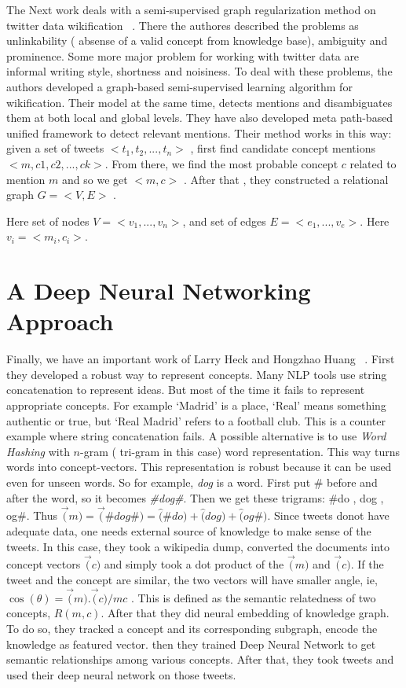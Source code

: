 The Next work deals with a semi-supervised graph regularization method on 
twitter data wikification ~\cite{ref4tw-wiki}. There the authores described the problems as unlinkability 
( absense of a valid concept from knowledge base), ambiguity and prominence. Some more major problem for working
with twitter data are informal writing style, shortness and noisiness. To deal with these problems, the authors 
developed a graph-based semi-supervised learning algorithm for wikification. Their model at the same time, detects 
mentions and disambiguates them at both local and global levels. They have also developed meta path-based unified framework
to detect relevant mentions. Their method works in this way: given a set of tweets $<t_1,t_2,... ,t_n>$ ,
first find candidate concept mentions $<m,c1,c2,...,ck>$. From there, we find the most probable concept $c$
related to  mention $m$ and so we get $<m,c>$ . After that , they constructed a relational graph $G= <V,E>$ .

Here set of nodes $V = <v_1,...,v_n>$, and set of edges $E = <e_1,...,v_e>$. Here $v_i = <m_i, c_i>$. 
\section{A Deep Neural Networking Approach}
Finally, we have an important work of Larry Heck and Hongzhao Huang ~\cite{ref1DeepLearning}. 
First they developed a robust way to represent concepts.
 Many NLP tools use string concatenation to represent ideas.
But most of the time it fails to represent appropriate concepts. For example `Madrid' is a place, `Real'
 means 
something authentic or true, but `Real Madrid' refers to a football club. 
This is a counter example where string concatenation fails.
A possible alternative is to use \textit{Word Hashing} with $n$-gram ( tri-gram in this case) 
word representation. This way turns words into concept-vectors. This representation is 
robust because it can be used even for unseen words.
So for example, \textit{dog} is a word. First put \# before and after the word, so it becomes \textit{\#dog\#}.
Then we get these trigrams: \#do , dog , og\#.
  Thus $ \vec(m) = \vec(\#dog\#) = \widehat(\#do) + \widehat(dog) + \widehat(og\#)$.
  Since tweets donot have adequate data, one needs external source of knowledge to  make sense of 
  the tweets. In this case, they took a wikipedia dump, converted the documents into concept vectors
   $\vec(c)$ and simply took a dot product of the $ \vec(m) $ and $ \vec(c) $. If the tweet and the concept 
   are similar, the two vectors will have smaller angle, ie, $ \cos(\theta) = \vec(m).\vec(c)/mc $ . 
This is defined as the semantic relatedness of two concepts, $R(m,c) $.
 After that they did neural embedding of knowledge
 graph. 
 To do so, they tracked a concept and its corresponding subgraph, encode the knowledge as featured 
 vector.
 then they trained Deep Neural Network to get semantic relationships among various concepts.
After that, they took tweets and used their deep neural network on those tweets.
\endinput
